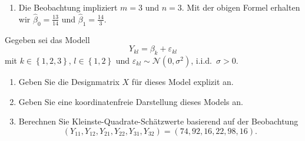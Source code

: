 \begin{enumerate}
\begin{align*}
\begin{array}{c}
                    \frac{1}{n} \left( y_{m+1}+ \ldots + y_{m+n} \right)
                \end{array}
                \right) = \left(
                \begin{array}{c}
                    \hat\beta_0 \\ \hat\beta_1
                \end{array}
                \right).
            \end{align*}
        \item Die Beobachtung impliziert $m=3$ und $n=3$. Mit der obigen Formel erhalten wir
            $\hat \beta_0 = \frac{13}{14}$ und $\hat \beta_1 = \frac{14}{3}$.
\end{enumerate}






Gegeben sei das Modell
\begin{equation*}
    Y_{kl} = \beta_k + \varepsilon_{kl}
\end{equation*}
mit $k\in \left\{ 1,2,3 \right\}$, $l\in \left\{ 1,2 \right\}$ und 
$\varepsilon_{kl}\sim \mathcal N(0,\sigma^2)$, i.i.d.\  $\sigma>0$.
\begin{enumerate}
    \item Geben Sie die Designmatrix $X$ für dieses Model explizit an.
    \item Geben Sie eine koordinatenfreie Darstellung dieses Models an.
    \item Berechnen Sie Kleinste-Quadrate-Schätzwerte basierend auf der Beobachtung
        \begin{equation*}
            \left( Y_{11},Y_{12},Y_{21},Y_{22},Y_{31},Y_{32} \right) = \left(74, 92, 16, 22, 98, 16 \right).
        \end{equation*}
\end{enumerate}


